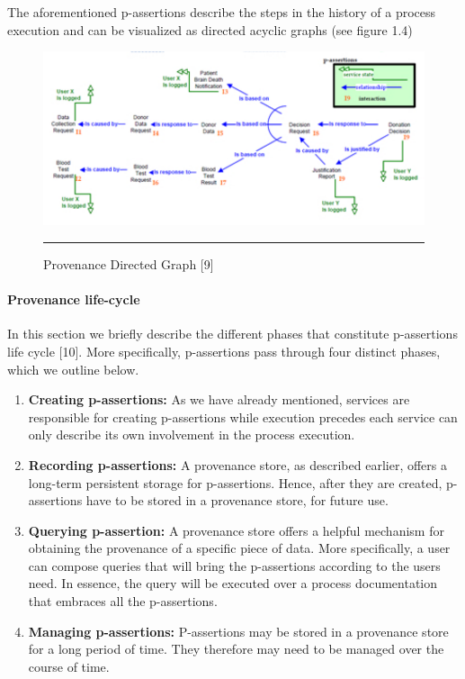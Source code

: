 The aforementioned p-assertions describe the steps in the history of a process execution and can be visualized as directed acyclic graphs (see figure 1.4)

\begin{figure}[htbp]
	\centering
		\includegraphics{./Figures/figure4.pdf}
		\rule{35em}{0.5pt}
	\caption[Provenance Directed Graph]{Provenance Directed Graph [9]}
	\label{fig:provGraph}
\end{figure}


\paragraph{Provenance life-cycle}

In this section we briefly describe the different phases that constitute p-assertions life cycle [10]. More specifically, p-assertions pass through four distinct phases, which we outline below.
\begin{enumerate}
  \item
        \textbf{Creating p-assertions:} As we have already mentioned, services are responsible for creating p-assertions while execution precedes each service can only describe its own involvement in the process execution.
  \item
        \textbf{Recording p-assertions:} A provenance store, as described earlier, offers a long-term persistent storage for p-assertions. Hence, after they are created, p-assertions have to be stored in a provenance store, for future use.
  \item
        \textbf{Querying p-assertion:} A provenance store offers a helpful mechanism for obtaining the provenance of a specific piece of data. More specifically, a user can compose queries that will bring the p-assertions according to the users need. In essence, the query will be executed over a process documentation that embraces all the p-assertions.
  \item
        \textbf{Managing p-assertions:} P-assertions may be stored in a provenance store for a long period of time. They therefore may need to be managed over the course of time.
\end{enumerate}

